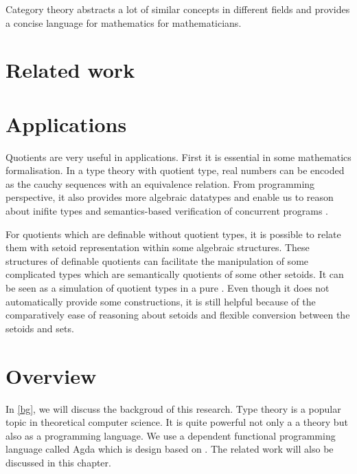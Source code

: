 Category theory abstracts a lot of similar concepts in different
fields and provides a concise language for mathematics for
mathematicians.

\section{Related work}



\section{Applications}


Quotients are very useful in applications. First it is essential in some
mathematics formalisation. 
In a type theory with quotient type, real numbers can be encoded as
the cauchy sequences with an equivalence relation.
From programming perspective,  it also provides more algebraic
datatypes and enable us to reason about inifite types and
semantics-based verification of concurrent programs \cite{hof:phd}.

For quotients which are definable without quotient types, it is
possible to relate them with setoid representation within some
algebraic structures. 
These structures of definable quotients can facilitate the
manipulation of some complicated types which
are semantically quotients of some other setoids. It can be seen as a
simulation of quotient types in a pure \itt. Even though it does not
automatically provide some constructions, it is still helpful because
of the comparatively ease of reasoning about setoids and flexible
conversion between the setoids and sets.




\section{Overview}





In \autoref{bg}, we will discuss the backgroud of this research. Type theory is a popular topic in
theoretical computer science. It is quite powerful not only a a theory
but also as a programming language. We use a dependent functional
programming language called Agda which is design based on \mltt. The
 related work will also be discussed in this chapter.


